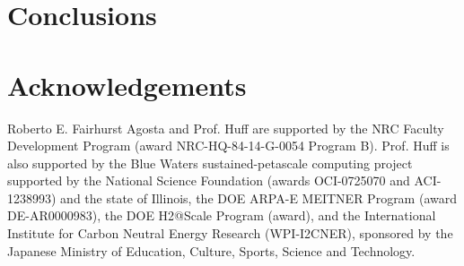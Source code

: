 \documentclass{anstrans}
\begin{document}

\section{Conclusions}



\section{Acknowledgements}

Roberto E. Fairhurst Agosta and Prof. Huff are supported by the \gls{NRC} Faculty Development Program (award NRC-HQ-84-14-G-0054 Program B).
Prof. Huff is also supported by the Blue Waters sustained-petascale computing project supported by the National Science Foundation (awards OCI-0725070 and ACI-1238993) and the state of Illinois, the DOE ARPA-E MEITNER Program (award DE-AR0000983), the DOE H2@Scale Program (award), and the International Institute for Carbon Neutral Energy Research (WPI-I2CNER), sponsored by the Japanese Ministry of Education, Culture, Sports, Science and Technology.



\end{document}
